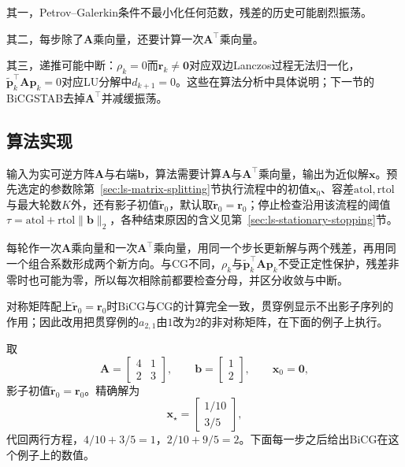 其一，Petrov--Galerkin条件不最小化任何范数，残差的历史可能剧烈振荡。

其二，每步除了$\bm A$乘向量，还要计算一次$\bm A^\top$乘向量。

其三，递推可能中断：$\rho_k=0$而$\bm r_k\ne\bm0$对应双边Lanczos过程无法归一化，$\widetilde{\bm p}_k^\top\bm A\bm p_k=0$对应LU分解中$d_{k+1}=0$。这些在算法分析中具体说明；下一节的BiCGSTAB去掉$\bm A^\top$并减缓振荡。

\subsection{算法实现}

输入为实可逆方阵$\bm A$与右端$\bm b$，算法需要计算$\bm A$与$\bm A^\top$乘向量，输出为近似解$\bm x$。预先选定的参数除第~\ref{sec:ls-matrix-splitting}节执行流程中的初值$\bm x_0$、容差$\mathrm{atol},\mathrm{rtol}$与最大轮数$K$外，还有影子初值$\widetilde{\bm r}_0$，默认取$\widetilde{\bm r}_0=\bm r_0$；停止检查沿用该流程的阈值$\tau=\mathrm{atol}+\mathrm{rtol}\lVert\bm b\rVert_2$，各种结束原因的含义见第~\ref{sec:ls-stationary-stopping}节。

每轮作一次$\bm A$乘向量和一次$\bm A^\top$乘向量，用同一个步长更新解与两个残差，再用同一个组合系数形成两个新方向。与CG不同，$\rho_k$与$\widetilde{\bm p}_k^\top\bm A\bm p_k$不受正定性保护，残差非零时也可能为零，所以每次相除前都要检查分母，并区分收敛与中断。

对称矩阵配上$\widetilde{\bm r}_0=\bm r_0$时BiCG与CG的计算完全一致，贯穿例显示不出影子序列的作用；因此改用把贯穿例的$a_{2,1}$由$1$改为$2$的非对称矩阵，在下面的例子上执行。

\begin{example}[非对称二阶系统上的BiCG]
\label{ex:ls-bicg-two-steps}
取
\[
 \bm A=\begin{bmatrix}4&1\\2&3\end{bmatrix},\qquad
 \bm b=\begin{bmatrix}1\\2\end{bmatrix},\qquad
 \bm x_0=\bm 0,
\]
影子初值$\widetilde{\bm r}_0=\bm r_0$。精确解为
\[
 \bm x_\star=\begin{bmatrix}1/10\\3/5\end{bmatrix},
\]
代回两行方程，$4/10+3/5=1$，$2/10+9/5=2$。下面每一步之后给出BiCG在这个例子上的数值。
\end{example}


